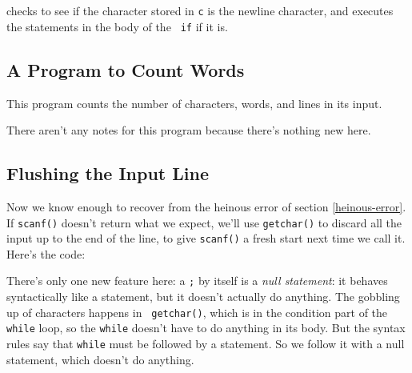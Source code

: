 \begin{flushleft}
\verb% if (c == '\n') { ... } % 
\end{flushleft}

\noindent checks to see if the character stored in {\tt c} is the
newline character, and executes the statements in the body of the {\tt
if} if it is.

\subsection{A Program to Count Words}

This program counts the number of characters, words, and lines in its input.



There aren't any notes for this program because there's nothing new here.

\subsection{Flushing the Input Line}

Now we know enough to recover from the heinous error of section
\ref{heinous-error}.  If {\tt scanf()} doesn't return what we expect,
we'll use {\tt getchar()} to discard all the input up to the end of the
line, to give {\tt scanf()} a fresh start next time we call it.  Here's
the code:



There's only one new feature here: a {\tt ;} by itself is a {\em null
statement}\/: it behaves syntactically like a statement, but it doesn't
actually do anything.  The gobbling up of characters happens in {\tt
getchar()}, which is in the condition part of the {\tt while} loop, so
the {\tt while} doesn't have to do anything in its body.  But the syntax
rules say that {\tt while} must be followed by a statement.  So we
follow it with a null statement, which doesn't do anything.
